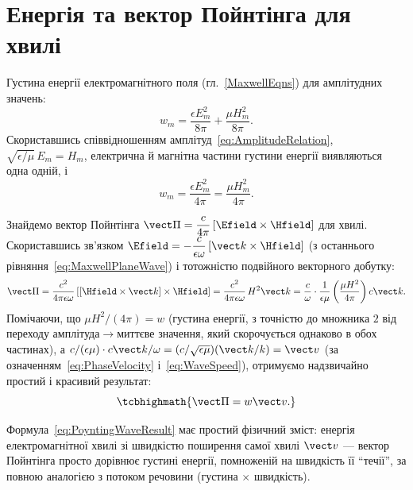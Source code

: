\section{Енергія та вектор Пойнтінга для хвилі}

Густина енергії електромагнітного поля (гл.~\ref{MaxwellEqns}) для амплітудних значень:
\begin{equation}\label{eq:EnergyDensityAmplitude}
	w_m = \frac{\epsilon E_m^2}{8\pi}+\frac{\mu H_m^2}{8\pi}.
\end{equation}
Скориставшись співвідношенням амплітуд~\eqref{eq:AmplitudeRelation}, $\sqrt{\epsilon/\mu}\,E_m = H_m$, електрична й магнітна частини густини
енергії виявляються  одна одній, і
\begin{equation*}
	w_m = \frac{\epsilon E_m^2}{4\pi} = \frac{\mu H_m^2}{4\pi}.
\end{equation*}

Знайдемо вектор Пойнтінга $\vect\Pi = \dfrac{c}{4\pi}\left[\Efield\times\Hfield\right]$ для хвилі. Скориставшись зв'язком
$\Efield = -\dfrac{c}{\epsilon\omega}\left[\vect k\times\Hfield\right]$ (з останнього рівняння~\eqref{eq:MaxwellPlaneWave}) і тотожністю подвійного
векторного добутку:
\begin{equation}\label{eq:PoyntingWaveDerivation}
	\vect\Pi = \frac{c^2}{4\pi\epsilon\omega}\left[\left[\Hfield\times\vect k\right]\times\Hfield\right] = \frac{c^2}{4\pi\epsilon\omega}\,H^2\vect
	k = \frac{c}{\omega}\cdot\frac1{\epsilon\mu}\left(\frac{\mu H^2}{4\pi}\right)c\vect k.
\end{equation}
Помічаючи, що $\mu H^2/(4\pi) = w$ (густина енергії, з точністю до множника $2$ від переходу амплітуда$\to$миттєве значення, який скорочується
однаково в обох частинах), а $c/(\epsilon\mu) \cdot c\vect k/\omega = (c/\sqrt{\epsilon\mu})(\vect k/k) = \vect v$ (за
означенням~\eqref{eq:PhaseVelocity} і~\eqref{eq:WaveSpeed}), отримуємо надзвичайно простий і красивий результат:
\begin{equation}\label{eq:PoyntingWaveResult}
	\tcbhighmath{
		\vect\Pi = w\vect v.
	}
\end{equation}

\begin{Attention}
	Формула~\eqref{eq:PoyntingWaveResult} має простий фізичний зміст: енергія електромагнітної хвилі  зі
	швидкістю поширення самої хвилі $\vect v$ --- вектор Пойнтінга просто дорівнює густині енергії, помноженій на швидкість її \enquote{течії}, за
	повною аналогією з потоком речовини (густина $\times$ швидкість).
\end{Attention}

